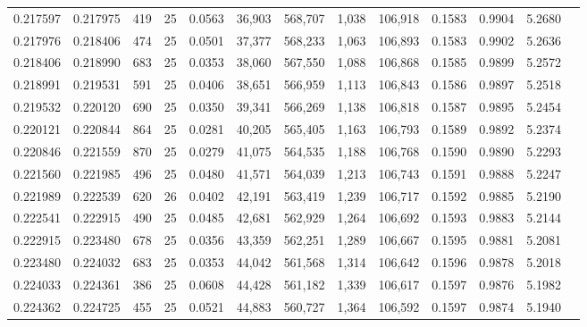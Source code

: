 \begin{tabular}{rrrrrrrrrrrrr}
0.217597 & 0.217975 &   419 &  25 &                                     0.0563 &  36,903 & 568,707 &   1,038 & 106,918 & 0.1583 & 0.9904 & 5.2680 \\
0.217976 & 0.218406 &   474 &  25 &                                     0.0501 &  37,377 & 568,233 &   1,063 & 106,893 & 0.1583 & 0.9902 & 5.2636 \\
0.218406 & 0.218990 &   683 &  25 &                                     0.0353 &  38,060 & 567,550 &   1,088 & 106,868 & 0.1585 & 0.9899 & 5.2572 \\
0.218991 & 0.219531 &   591 &  25 &                                     0.0406 &  38,651 & 566,959 &   1,113 & 106,843 & 0.1586 & 0.9897 & 5.2518 \\
0.219532 & 0.220120 &   690 &  25 &                                     0.0350 &  39,341 & 566,269 &   1,138 & 106,818 & 0.1587 & 0.9895 & 5.2454 \\
0.220121 & 0.220844 &   864 &  25 &                                     0.0281 &  40,205 & 565,405 &   1,163 & 106,793 & 0.1589 & 0.9892 & 5.2374 \\
0.220846 & 0.221559 &   870 &  25 &                                     0.0279 &  41,075 & 564,535 &   1,188 & 106,768 & 0.1590 & 0.9890 & 5.2293 \\
0.221560 & 0.221985 &   496 &  25 &                                     0.0480 &  41,571 & 564,039 &   1,213 & 106,743 & 0.1591 & 0.9888 & 5.2247 \\
0.221989 & 0.222539 &   620 &  26 &                                     0.0402 &  42,191 & 563,419 &   1,239 & 106,717 & 0.1592 & 0.9885 & 5.2190 \\
0.222541 & 0.222915 &   490 &  25 &                                     0.0485 &  42,681 & 562,929 &   1,264 & 106,692 & 0.1593 & 0.9883 & 5.2144 \\
0.222915 & 0.223480 &   678 &  25 &                                     0.0356 &  43,359 & 562,251 &   1,289 & 106,667 & 0.1595 & 0.9881 & 5.2081 \\
0.223480 & 0.224032 &   683 &  25 &                                     0.0353 &  44,042 & 561,568 &   1,314 & 106,642 & 0.1596 & 0.9878 & 5.2018 \\
0.224033 & 0.224361 &   386 &  25 &                                     0.0608 &  44,428 & 561,182 &   1,339 & 106,617 & 0.1597 & 0.9876 & 5.1982 \\
0.224362 & 0.224725 &   455 &  25 &                                     0.0521 &  44,883 & 560,727 &   1,364 & 106,592 & 0.1597 & 0.9874 & 5.1940 \\

\end{tabular}
